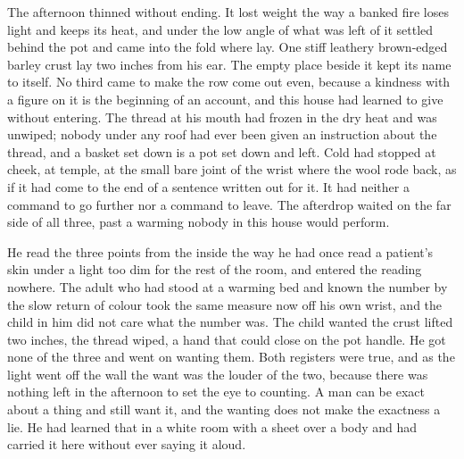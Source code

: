 The afternoon thinned without ending. It lost weight the way a banked fire loses light and keeps its heat, and under the low angle of  what was left of it settled behind the pot and came into the fold where  lay. One stiff leathery brown-edged barley crust lay two inches from his ear. The empty place beside it kept its name to itself. No third came to make the row come out even, because a kindness with a figure on it is the beginning of an account, and this house had learned to give without entering. The thread at his mouth had frozen in the dry heat and was unwiped; nobody under any roof had ever been given an instruction about the thread, and a basket set down is a pot set down and left. Cold had stopped at cheek, at temple, at the small bare joint of the wrist where the wool rode back, as if it had come to the end of a sentence written out for it. It had neither a command to go further nor a command to leave. The afterdrop waited on the far side of all three, past a warming nobody in this house would perform.

He read the three points from the inside the way he had once read a patient's skin under a light too dim for the rest of the room, and entered the reading nowhere. The adult who had stood at a warming bed and known the number by the slow return of colour took the same measure now off his own wrist, and the child in him did not care what the number was. The child wanted the crust lifted two inches, the thread wiped, a hand that could close on the pot handle. He got none of the three and went on wanting them. Both registers were true, and as the light went off the wall the want was the louder of the two, because there was nothing left in the afternoon to set the eye to counting. A man can be exact about a thing and still want it, and the wanting does not make the exactness a lie. He had learned that in a white room with a sheet over a body and had carried it here without ever saying it aloud.

